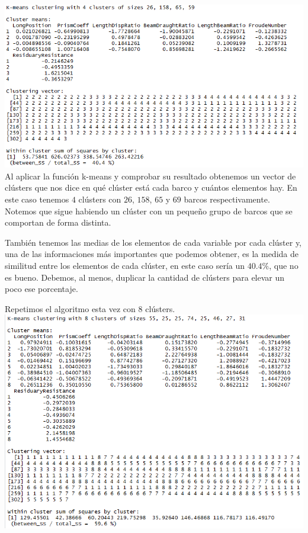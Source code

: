 \documentclass[twoside]{article}
\begin{document}
\begin{multicols}{2}
\includegraphics[scale=0.3]{images/pic_32.png} \\

Al aplicar la funci\'on k-means y comprobar su resultado obtenemos un vector de cl\'usters que nos dice en qu\'e cl\'uster est\'a cada barco y cu\'antos elementos hay. En este caso tenemos $4$ cl\'usters con $26$, $158$, $65$ y $69$ barcos respectivamente. Notemos que sigue habiendo un cl\'uster con un peque\~no grupo de barcos que se comportan de forma distinta.

Tambi\'en tenemos las medias de los elementos de cada variable por cada cl\'uster y, una de las informaciones m\'as importantes que podemos obtener, es la medida de similitud entre los elementos de cada cl\'uster, en este caso ser\'ia un $40.4\%$, que no es bueno. Debemos, al menos, duplicar la cantidad de cl\'usters para elevar un poco ese porcentaje.

Repetimos el algoritmo esta vez con $8$ cl\'usters.\\

\includegraphics[scale=0.3]{images/pic_33.png} \\


\end{multicols}
\end{document}

